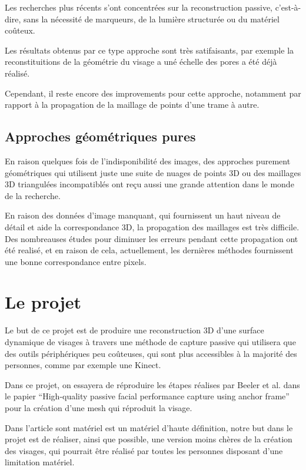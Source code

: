 \documentclass[a4paper,12pt]{article}
\begin{document}
Les recherches plus récents s'ont concentrées sur la reconstruction
passive, c'est-à-dire, sans la nécessité de marqueurs, de la lumière
structurée ou du matériel coûteux. 

Les résultats obtenus par ce type approche sont très satifaisants, par
exemple la reconstituitions de la géométrie du visage a uné échelle
des pores a été déjà réalisé. 
 
Cependant, il reste encore des improvements pour cette approche,
notamment par rapport à la propagation de la maillage de points d'une
trame à autre. 

\subsection*{Approches géométriques pures}

En raison quelques fois de l'indisponibilité des images, des approches purement
géométriques qui utilisent juste une suite de nuages de points 3D ou
des maillages 3D triangulées incompatiblés ont reçu aussi une grande attention
dans le monde de la recherche.

En raison des données d'image manquant, qui fournissent un haut niveau
de détail et aide la correspondance 3D, la propagation des maillages 
est très difficile. Des nombreauses études pour diminuer les erreurs
pendant cette propagation ont été realisé, et en raison de cela,
actuellement, les dernières méthodes fournissent une bonne
correspondance entre pixels. %

\section{Le projet}

Le but de ce projet est de produire une reconstruction 3D d'une
surface dynamique de visages à travers une méthode de capture passive
qui utilisera que des outils périphériques peu coûteuses, qui sont
plus accessibles à la majorité des personnes, comme par exemple une Kinect.

Dans ce projet, on essayera de réproduire les étapes réalises par
Beeler et al. dans le papier ``High-quality passive facial performance
capture using anchor frame''\cite{Beeler:2011:HPF:2010324.1964970}
pour la création d'une mesh qui réproduit la visage. 

Dans l'article sont matériel est un matériel d'haute définition, notre
but dans le projet est de réaliser, ainsi que possible, une version
moins chères de la création des visages, qui pourrait être réalisé par
toutes les personnes disposant d'une limitation matériel. 
\end{document}
